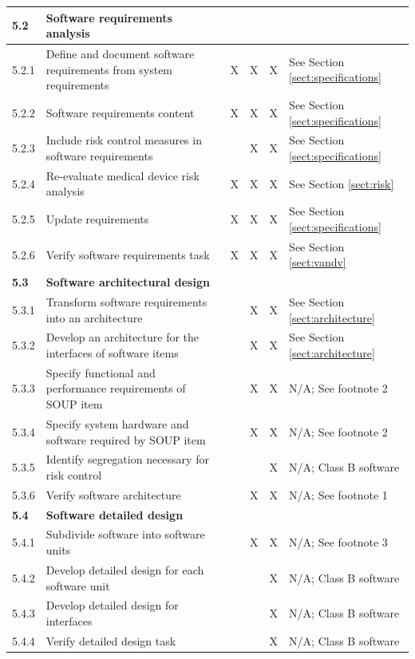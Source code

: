 \documentclass[]{article}
\begin{document}
\begin{center}
\begin{longtable}{ |p{1.3cm}| p{5.5cm}| p{0.7cm}| p{0.7cm}| p{0.7cm}| p{3.5cm}| }
	
	\rowcolor{blue!25} \textbf{5.2} & \textbf{Software requirements analysis } & &  & &  \\ \hline
	5.2.1 & Define and document software requirements from system requirements & X & X & X & See Section \ref{sect:specifications} \\ \hline
	5.2.2 & Software requirements content & X & X & X & See Section \ref{sect:specifications} \\ \hline
	5.2.3 & Include risk control measures in software requirements &  & X & X & See Section \ref{sect:specifications} \\ \hline
	5.2.4 & Re-evaluate medical device risk analysis & X & X & X & See Section \ref{sect:risk} \\ \hline
	5.2.5 & Update requirements & X & X & X & See Section \ref{sect:specifications} \\ \hline
	5.2.6 & Verify software requirements task & X & X & X & See Section \ref{sect:vandv} \\ \hline
	
	
	\rowcolor{blue!25} \textbf{5.3} & \textbf{Software architectural design} &  &  &  &  \\ \hline
	5.3.1 & Transform software requirements into an architecture &  & X & X & See Section \ref{sect:architecture} \\ \hline
	5.3.2 & Develop an architecture for the interfaces of software items &   & X & X & See Section \ref{sect:architecture} \\ \hline
	5.3.3 & Specify functional and performance requirements of SOUP item &   & X & X & N/A; See footnote 2  \\ \hline
	5.3.4 & Specify system hardware and software required by SOUP item  &  & X & X & N/A; See footnote 2 \\ \hline
	5.3.5 & Identify segregation necessary for risk control &  &  & X & N/A; Class B software  \\ \hline
	5.3.6 & Verify software architecture &  & X & X & N/A; See footnote 1 \\ \hline
	
	
	\rowcolor{blue!25} \textbf{5.4} & \textbf{Software detailed design} &  &  &  &  \\ \hline
	5.4.1 & Subdivide software into software units &  & X & X & N/A; See footnote 3  \\ \hline
	5.4.2 & Develop detailed design for each software unit &  &  & X & N/A; Class B software  \\ \hline
	5.4.3 & Develop detailed design for interfaces &  &  & X & N/A; Class B software  \\ \hline
	5.4.4 & Verify detailed design task &  &   & X & N/A; Class B software  \\ \hline
	

\end{longtable}
\end{center}
\end{document}
